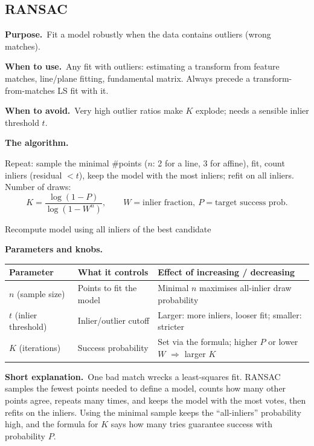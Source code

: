\documentclass[10pt]{article}
\makeatletter
\newcommand{\Purpose}{\par\smallskip\textbf{Purpose.}\ }
\newcommand{\WhenUse}{\par\textbf{When to use.}\ }
\newcommand{\WhenAvoid}{\par\textbf{When to avoid.}\ }
\newcommand{\TheAlgo}{\par\smallskip\textbf{The algorithm.}\par\nopagebreak}
\newcommand{\Knobs}{\par\smallskip\textbf{Parameters and knobs.}\par\nopagebreak}
\newcommand{\ShortExp}{\par\smallskip\textbf{Short explanation.}\ }
\newenvironment{ptable}{\begin{center}\small\begin{tabular}{@{}p{2.5cm} p{5.9cm} p{6.2cm}@{}}\toprule
Parameter & What it controls & Effect of increasing / decreasing \\ \midrule}
{\bottomrule\end{tabular}\end{center}}
\makeatother
\begin{document}
\subsection{RANSAC}
\Purpose Fit a model robustly when the data contains outliers (wrong matches).
\WhenUse Any fit with outliers: estimating a transform from feature matches, line/plane fitting,
fundamental matrix. Always precede a transform-from-matches LS fit with it.
\WhenAvoid Very high outlier ratios make $K$ explode; needs a sensible inlier threshold $t$.
\TheAlgo Repeat: sample the minimal \#points ($n$: 2 for a line, 3 for affine), fit, count inliers
(residual $<t$), keep the model with the most inliers; refit on all inliers. Number of draws:
\[
K=\frac{\log(1-P)}{\log(1-W^n)},\qquad W=\text{inlier fraction},\ P=\text{target success prob}.
\]

\begin{algorithm}[H]
\SetAlgoLined
{}
Recompute model using all inliers of the best candidate\;
\caption{RANSAC}
\end{algorithm}

\Knobs
\begin{ptable}
$n$ (sample size) & Points to fit the model & Minimal $n$ maximises all-inlier draw probability \\
$t$ (inlier threshold) & Inlier/outlier cutoff & Larger: more inliers, looser fit; smaller: stricter \\
$K$ (iterations) & Success probability & Set via the formula; higher $P$ or lower $W$ $\Rightarrow$ larger $K$ \\
\end{ptable}
\ShortExp One bad match wrecks a least-squares fit. RANSAC samples the fewest points needed to define a
model, counts how many other points agree, repeats many times, and keeps the model with the most votes,
then refits on the inliers. Using the minimal sample keeps the ``all-inliers'' probability high, and the
formula for $K$ says how many tries guarantee success with probability $P$.

\end{document}
